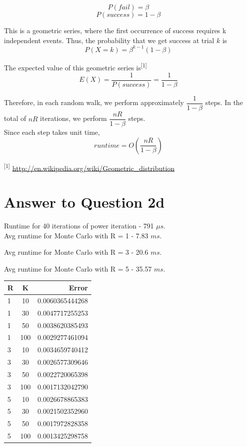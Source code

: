 \documentclass[11pt]{article}
\begin{document}
{$$P(fail) = \beta$$
$$P(success) = 1 - \beta$$

This is a geometric series, where the first occurrence of success requires k independent events. Thus, the probability that we get success at trial $k$ is $$P(X=k) = \beta^{k-1} (1-\beta) $$

The expected value of this geometric series is\textsuperscript{[1]} $$E(X) = \dfrac{1}{P(success)} = \dfrac{1}{1-\beta}$$

Therefore, in each random walk, we perform approximately $\dfrac{1}{1-\beta}$ steps. In the total of $nR$ iterations, we perform $\dfrac{nR}{1-\beta}$ steps.\\

Since each step takes unit time, 
$$runtime = O\left(\dfrac{nR}{1-\beta}\right)$$

\vspace{5cm}
\begin{small}
\textsuperscript{[1]} \url{ http://en.wikipedia.org/wiki/Geometric_distribution}
\end{small}


\pagebreak[4]
\section*{Answer to Question 2d}
Runtime for 40 iterations of power iteration - 791 $\mu s$.\\

Avg runtime for Monte Carlo with R = 1 - 7.83 $ms$.\

Avg runtime for Monte Carlo with R = 3 - 20.6 $ms$.\

Avg runtime for Monte Carlo with R = 5 - 35.57 $ms$.\\

\begin{tabular}{l | c | r}
\hline R & K & Error \\
\hline 1 & 10 & 0.0060365444268\\
\hline 1 & 30 & 0.0047717255253\\
\hline 1 & 50 & 0.0038620385493\\
\hline 1 & 100 & 0.0029277461094\\
\hline 3 & 10 & 0.0034659740412\\
\hline 3 & 30 & 0.0026577309646\\
\hline 3 & 50 & 0.0022720065398\\
\hline 3 & 100 & 0.0017132042790\\
\hline 5 & 10 & 0.0026678865383\\
\hline 5 & 30 & 0.0021502352960\\
\hline 5 & 50 & 0.0017972828358\\
\hline 5 & 100 & 0.0013425298758\\
\hline
\end{tabular}
\vspace{10mm}

}
\end{document}
